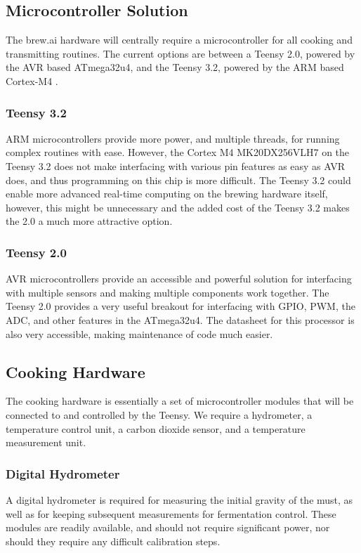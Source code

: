 \documentclass[draftclsnofoot,onecolumn,letterpaper,10pt]{IEEEtran}
\begin{document}
\subsection{Microcontroller Solution}
The brew.ai hardware will centrally require a microcontroller for all cooking and transmitting routines.
The current options are between a Teensy 2.0, powered by the AVR based ATmega32u4, and the Teensy 3.2, powered by the ARM based Cortex-M4 \cite{teensy}. 
\subsubsection{Teensy 3.2}
ARM microcontrollers provide more power, and multiple threads, for running complex routines with ease.
However, the Cortex M4 MK20DX256VLH7 \cite{datasheet} on the Teensy 3.2 does not make interfacing with various pin features as easy as AVR does, and thus 
programming on this chip is more difficult.
The Teensy 3.2 could enable more advanced real-time computing on the brewing hardware itself, however, this might be unnecessary and the added cost of the
	Teensy 3.2 makes the 2.0 a much more attractive option.
\subsubsection{Teensy 2.0}
AVR microcontrollers provide an accessible and powerful solution for interfacing with multiple sensors and making multiple components work together.
The Teensy 2.0 provides a very useful breakout for interfacing with GPIO, PWM, the ADC, and other features in the ATmega32u4.
The datasheet for this processor is also very accessible, making maintenance of code much easier.

\subsection{Cooking Hardware}
The cooking hardware is essentially a set of microcontroller modules that will be connected to and controlled by the Teensy.
We require a hydrometer, a temperature control unit, a carbon dioxide sensor, and a temperature measurement unit.
\subsubsection{Digital Hydrometer}
A digital hydrometer is required for measuring the initial gravity of the must, as well as for keeping subsequent measurements for fermentation control.
These modules are readily available, and should not require significant power, nor should they require any difficult calibration steps.
\end{document}
